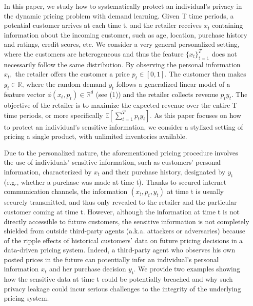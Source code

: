 In this paper, we study how to systematically protect an individual's privacy in the dynamic pricing problem with demand learning. Given T time periods, a potential customer arrives at each time t, and the retailer receives \(x _ { t }\) containing information about the incoming customer, such as age, location, purchase history and ratings, credit scores, etc. We consider a very general personalized setting, where the customers are heterogeneous and thus the feature \(\{ x _ { t } \} _ { t = 1 } ^ { T }\) does not necessarily follow the same distribution. By observing the personal information \(x _ { t } ,\) the retailer offers the customer a price \(p _ { t } \in [ 0 , 1 ]\). The customer then makes \(y _ { t } \in \mathbb { R }\), where the random demand \(y _ { t }\) follows a generalized linear model of a feature vector \(\phi ( x _ { t } , p _ { t } ) \in \mathbb { R } ^ { d }\) (see (1)) and the retailer collects revenue \(p _ { t } y _ { t }\). The objective of the retailer is to maximize the expected revenue over the entire T time periods, or more specifically \(\mathbb { E } [ \sum _ { t = 1 } ^ { T } p _ { t } y _ { t } ]\). As this paper focuses on how to protect an individual's sensitive information, we consider a stylized setting of pricing a single product, with unlimited inventories available.

Due to the personalized nature, the aforementioned pricing procedure involves the use of individuals' sensitive information, such as customers' personal information, characterized by \(x _ { t }\) and their purchase history, designated by \(y _ { t }\) (e.g., whether a purchase was made at time t). Thanks to secured internet communication channels, the information \(( x _ { t } , p _ { t } , y _ { t } )\) at time t is usually securely transmitted, and thus only revealed to the retailer and the particular customer coming at time t. However, although the information at time t is not directly accessible to future customers, the sensitive information is not completely shielded from outside third-party agents (a.k.a. attackers or adversaries) because of the ripple effects of historical customers' data on future pricing decisions in a data-driven pricing system. Indeed, a third-party agent who observes his own posted prices in the future can potentially infer an individual's personal information \(x _ { t }\) and her purchase decision \(y _ { t }\). We provide two examples showing how the sensitive data at time t could be potentially breached and why such privacy leakage could incur serious challenges to the integrity of the underlying pricing system.


